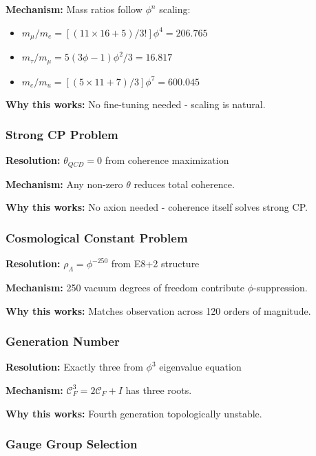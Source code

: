 \documentclass[11pt]{article}
\theoremstyle{definition}
\newcommand{\goldenratio}{\phi}
\newcommand{\coherence}{\mathcal{C}}
\begin{document}
\textbf{Mechanism:} Mass ratios follow $\goldenratio^n$ scaling:
\begin{itemize}
\item $m_\mu/m_e = [(11\times16+5)/3!]\goldenratio^4 = 206.765$
\item $m_\tau/m_\mu = 5(3\goldenratio-1)\goldenratio^2/3 = 16.817$
\item $m_c/m_u = [(5\times11+7)/3]\goldenratio^7 = 600.045$
\end{itemize}

\textbf{Why this works:} No fine-tuning needed - scaling is natural.

\subsubsection{Strong CP Problem}

\textbf{Resolution:} $\theta_{QCD} = 0$ from coherence maximization

\textbf{Mechanism:} Any non-zero $\theta$ reduces total coherence.

\textbf{Why this works:} No axion needed - coherence itself solves strong CP.

\subsubsection{Cosmological Constant Problem}

\textbf{Resolution:} $\rho_\Lambda = \goldenratio^{-250}$ from E8+2 structure

\textbf{Mechanism:} 250 vacuum degrees of freedom contribute $\goldenratio$-suppression.

\textbf{Why this works:} Matches observation across 120 orders of magnitude.

\subsubsection{Generation Number}

\textbf{Resolution:} Exactly three from $\goldenratio^3$ eigenvalue equation

\textbf{Mechanism:} $\coherence_F^3 = 2\coherence_F + I$ has three roots.

\textbf{Why this works:} Fourth generation topologically unstable.

\subsubsection{Gauge Group Selection}
\end{document}
